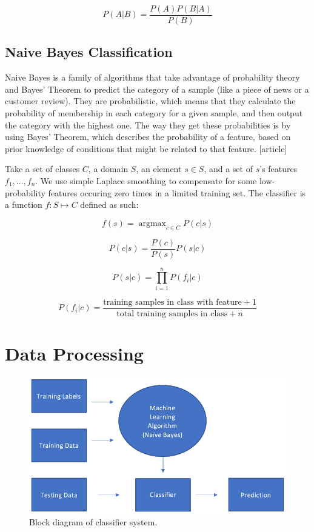 \documentclass[format=acmlarge]{acmart}
\DeclareMathOperator*{\argmax}{argmax}
\begin{document}
$$P(A|B) = \frac{P(A) P(B|A)}{P(B)}$$

\subsection{Naive Bayes Classification}
Naive Bayes is a family of algorithms that take advantage of probability theory and Bayes' Theorem to predict the category of a sample (like a piece of news or a customer review). They are probabilistic, which means that they calculate the probability of membership in each category for a given sample, and then output the category with the highest one. The way they get these probabilities is by using Bayes' Theorem, which describes the probability of a feature, based on prior knowledge of conditions that might be related to that feature. [article]

Take a set of classes $C$, a domain $S$, an element $s \in S$, and a set of $s$'s features $f_1, ..., f_n$.  We use simple Laplace smoothing to compensate for some low-probability features occuring zero times in a limited training set.  The classifier is a function $f: S \mapsto C$ defined as such:

$$f(s) = \argmax_{c \in C} P(c|s)$$

$$P(c|s) = \frac{P(c)}{P(s)} P(s|c)$$

$$P(s|c) = \prod_{i = 1}^n P(f_i|c)$$

$$P(f_i|c) = \frac{\textrm{training samples in class with feature} + 1}{\textrm{total training samples in class} + n}$$

\section{Data Processing}
\begin{figure}
  \includegraphics{block-diagram}
  \caption{Block diagram of classifier system.}
  \label{fig:one}
\end{figure}
\end{document}
